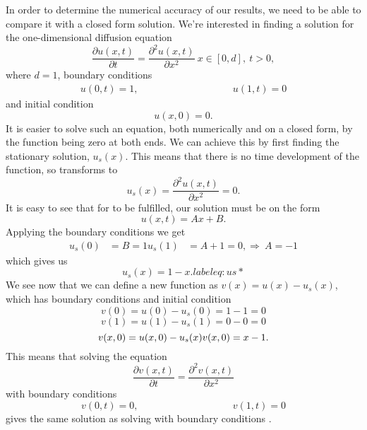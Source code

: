 
In order to determine the numerical accuracy of our results, we need to be able
to compare it with a closed form solution. We're interested in finding a
solution for the one-dimensional diffusion equation
%
\begin{equation}
	\frac{\partial u(x,t)}{\partial t} = \frac{\partial^2 u(x,t)}{\partial x^2}
	\ x \in [0,d], \ t > 0,
	\label{eq:diffusioneq}
\end{equation}
%
where $d = 1$, boundary conditions 
%
\begin{align}
	u(0,t) = 1, \hspace{4cm} u(1,t) = 0
	\label{eq:bc}
\end{align}
%
and initial condition 
%
\begin{equation*}
	u(x,0) = 0.
\end{equation*}
%
It is easier to solve such an equation, both numerically and on a closed form,
by the function being zero at both ends. We can achieve this by first finding the
stationary solution, $u_s(x)$. This means that there is no time development of the
function, so  transforms to
%
\begin{equation}
	u_s(x) = \frac{\partial^2 u(x,t)}{\partial x^2} = 0.
	\label{eq:stationary}
\end{equation}
%
It is easy to see that for  to be fulfilled, our solution must
be on the form
%
\begin{equation*}
	u(x,t) = Ax + B.
\end{equation*}
%
Applying the boundary conditions  we get
%
\begin{align*}
	u_s(0) &= B = 1
	u_s(1) &= A + 1 = 0, \Rightarrow \ A = -1
\end{align*}
%
which gives us
%
\begin{equation*}
	u_s(x) = 1 - x.
	label{eq:us*}
\end{equation*}
%
We see now that we can define a new function as $v(x) = u(x) - u_s(x)$, which
has boundary conditions and initial condition
%
\begin{equation}
	v(0) = u(0) - u_s(0) = 1 - 1 = 0
	\label{eq:bc0new}
\end{equation}
\begin{equation}
	v(1) = u(1) - u_s(1) = 0 - 0 = 0
	\label{eq:bc1new}
\end{equation}
\begin{equation}
	v(x,0) = u(x,0) - u_s(x) \\
	v(x,0) = x - 1.
	\label{eq:newInitial}
\end{equation}
%
This means that solving the equation
%
\begin{equation*}
	\frac{\partial v(x,t)}{\partial t} = \frac{\partial^2 v(x,t)}{\partial x^2}
\end{equation*}
%
with boundary conditions
%
\begin{equation*}
	v(0,t) = 0, \hspace{4cm} v(1,t) = 0
\end{equation*}
%
gives the same solution as solving  with boundary conditions
.

